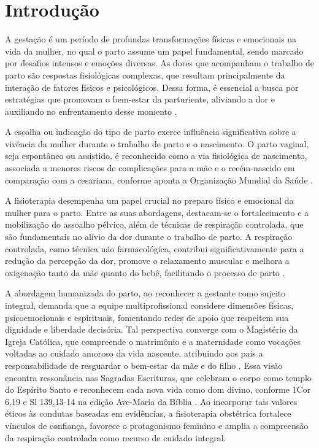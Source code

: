 \documentclass[openright]{tex/estilos/normas-utf-tex}
\begin{document}

\sumario

\clearpage
\hypersetup{pageanchor=true}

\chapter{Introdução}
\label{chap:introducao}

A gestação é um período de profundas transformações físicas e emocionais na vida da mulher, no qual o parto assume um papel fundamental, sendo marcado por desafios intensos e emoções diversas. As dores que acompanham o trabalho de parto são respostas fisiológicas complexas, que resultam principalmente da interação de fatores físicos e psicológicos. Dessa forma, é essencial a busca por estratégias que promovam o bem-estar da parturiente, aliviando a dor e auxiliando no enfrentamento desse momento \cite[p.~54]{almeida2005}.

A escolha ou indicação do tipo de parto exerce influência significativa sobre a vivência da mulher durante o trabalho de parto e o nascimento. O parto vaginal, seja espontâneo ou assistido, é reconhecido como a via fisiológica de nascimento, associada a menores riscos de complicações para a mãe e o recém-nascido em comparação com a cesariana, conforme aponta a Organização Mundial da Saúde \cite{oms2018}.

A fisioterapia desempenha um papel crucial no preparo físico e emocional da mulher para o parto. Entre as suas abordagens, destacam-se o fortalecimento e a mobilização do assoalho pélvico, além de técnicas de respiração controlada, que são fundamentais no alívio da dor durante o trabalho de parto. A respiração controlada, como técnica não farmacológica, contribui significativamente para a redução da percepção da dor, promove o relaxamento muscular e melhora a oxigenação tanto da mãe quanto do bebê, facilitando o processo de parto \cite{cortes2015}.

A abordagem humanizada do parto, ao reconhecer a gestante como sujeito integral, demanda que a equipe multiprofissional considere dimensões físicas, psicoemocionais e espirituais, fomentando redes de apoio que respeitem sua dignidade e liberdade decisória. Tal perspectiva converge com o Magistério da Igreja Católica, que compreende o matrimônio e a maternidade como vocações voltadas ao cuidado amoroso da vida nascente, atribuindo aos pais a responsabilidade de resguardar o bem-estar da mãe e do filho \cite[p.~431-432]{catecismo2000}. Essa visão encontra ressonância nas Sagradas Escrituras, que celebram o corpo como templo do Espírito Santo e reconhecem cada nova vida como dom divino, conforme 1Cor 6,19 e Sl 139,13-14 na edição Ave-Maria da Bíblia \cite{biblia2018}. Ao incorporar tais valores éticos às condutas baseadas em evidências, a fisioterapia obstétrica fortalece vínculos de confiança, favorece o protagonismo feminino e amplia a compreensão da respiração controlada como recurso de cuidado integral.
\end{document}
